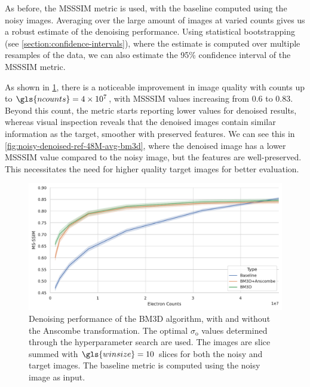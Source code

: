 As before, the \gls{MSSSIM} metric is used, with the baseline computed using the noisy images. Averaging over the large amount of images at varied counts gives us a robust estimate of the denoising performance. Using statistical bootstrapping (see \cref{section:confidence-intervals}), where the estimate is computed over multiple resamples of the data, we can also estimate the \num{95}\% confidence interval of the \gls{MSSSIM} metric.

As shown in \cref{fig:bm3d-msssim}, there is a noticeable improvement in image quality with counts up to $\gls{ncounts}=\num{4e7}$, with \gls{MSSSIM} values increasing from \num{0.6} to \num{0.83}. Beyond this count, the metric starts reporting lower values for denoised results, whereas visual inspection reveals that the denoised images contain similar information as the target, smoother with preserved features. We can see this in \cref{fig:noisy-denoised-ref-48M-avg-bm3d}, where the denoised image has a lower \gls{MSSSIM} value compared to the noisy image, but the features are well-preserved. This necessitates the need for higher quality target images for better evaluation.

\begin{figure}
    \centering
    \includegraphics[width=1\linewidth]{images/bm3d_msssim.pdf}
    \caption{Denoising performance of the \gls{BM3D} algorithm, with and without the Anscombe transformation. The optimal $\sigma_{\text{o}}$ values determined through the hyperparameter search are used. The images are slice summed with $\gls{winsize}=10$ slices for both the noisy and target images. The baseline metric is computed using the noisy image as input.}
    \label{fig:bm3d-msssim}
\end{figure}



